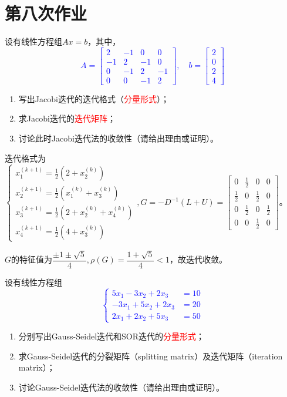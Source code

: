 \chapter{第八次作业}

    \begin{homework}[10pts]
        设有线性方程组$Ax=b$，其中，\textcolor{blue}{\[A=\begin{bmatrix}2&-1&0&0\\-1&2&-1&0\\0&-1&2&-1\\0&0&-1& 2\end{bmatrix},\quad b=\begin{bmatrix}2\\0\\2\\4\end{bmatrix}\]}
        \begin{enumerate}
            \item 写出Jacobi迭代的迭代格式（\textcolor{red}{分量形式}）；
            \item 求Jacobi迭代的\textcolor{red}{迭代矩阵}；
            \item 讨论此时Jacobi迭代法的收敛性（请给出理由或证明）。
        \end{enumerate}
    \end{homework}

    \begin{solution}
        迭代格式为$\begin{cases}x_1^{(k+1)}=\frac12(2+x_2^{(k)})\\x_2^{(k+1)}=\frac12(x_1^{(k)}+x_3^{(k)})\\x_3^{(k+1)}=\frac12(2+x_2^{(k)}+x_4^{(k)})\\x_4^{(k+1)}=\frac12(4+x_3^{(k)})\end{cases},G=-D^{-1}(L+U)=\begin{bmatrix}0&\frac12&0&0\\\frac12&0 &\frac12&0 \\0&\frac12&0&\frac12\\0&0&\frac12& 0\end{bmatrix}$。

        $G$的特征值为$\dfrac{\pm 1\pm\sqrt{5}}{4},\rho(G)=\dfrac{1+\sqrt{5}}4<1$，故迭代收敛。
    \end{solution}

    \begin{homework}[10pts]
        设有线性方程组\textcolor{blue}{\[\begin{cases}5x_1-3x_2+2x_3&=10\\-3x_1+5x_2+2x_3&=20\\2x_1+2x_2+5x_3&=50\end{cases}\]}
        \begin{enumerate}
            \item 分别写出Gauss-Seidel迭代和SOR迭代的\textcolor{red}{分量形式}；
            \item 求Gauss-Seidel迭代的分裂矩阵（splitting matrix）及迭代矩阵（iteration matrix）；
            \item 讨论Gauss-Seidel迭代法的收敛性（请给出理由或证明）。
        \end{enumerate}
    \end{homework}

